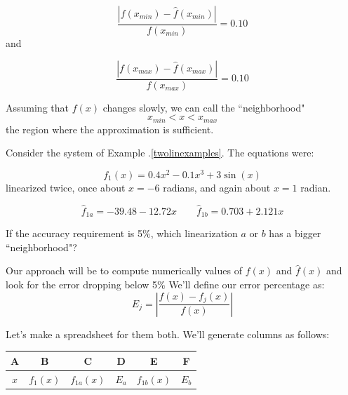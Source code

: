 \[
\frac   {|f(x_{min})-\hat{f}(x_{min})| } {f(x_{min})} = 0.10 
\]
and 

\[
\frac   {|f(x_{max})-\hat{f}(x_{max})| } {f(x_{max})} = 0.10 
\]

Assuming that $f(x)$ changes slowly, we can call the ``neighborhood" 
\[
x_{min} < x < x_{max} 
\]
the region where the approximation is sufficient. 



\begin{Example}
Consider the system of Example \thechapter.\ref{twolinexamples}.  The equations were:

\[
f_1(x) = 0.4x^2 -0.1x^3 + 3\sin(x)
\]
 linearized twice, once about $x=-6$ radians, and again about $x=1$ radian.

 
\[
\hat{f}_{1a} =  -39.48-12.72x \qquad \hat{f}_{1b} =  0.703+2.121x
\]

If the accuracy requirement is 5\%, which linearization $a$ or $b$ has a bigger ``neighborhood"?


Our approach will be to compute numerically values of $f(x)$ and $\hat{f}(x)$ and look for the error dropping below 5\%
We'll define our error percentage as:
\[
E_j = \left| \frac {f(x) - f_j(x)} {f(x)}  \right |
\]

Let's make a spreadsheet for them both.  We'll generate columns as follows:

\begin{tabular}{|c|c|c|c|c|c|}\hline
A & B & C & D & E & F \\ \hline
$x$  & $f_1(x)$ & $f_{1a}(x) $  &  $E_a$ & $f_{1b}(x) $ &  $E_b$ \\
\hline
\end{tabular}



\end{Example}
